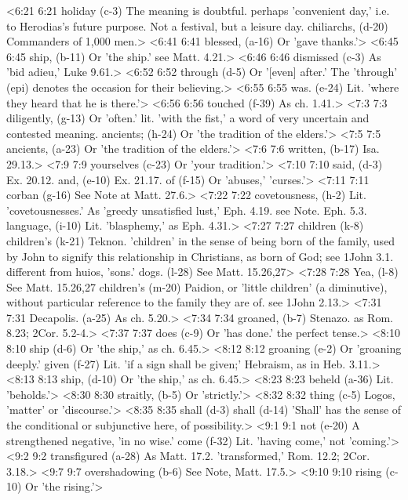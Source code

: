<6:21 6:21  holiday (c-3)  The meaning is doubtful. perhaps 'convenient day,' i.e. to  Herodias's future purpose. Not a festival, but a leisure day.
  chiliarchs, (d-20)  Commanders of 1,000 men.>
<6:41 6:41  blessed, (a-16)  Or 'gave thanks.'>
<6:45 6:45  ship, (b-11)  Or 'the ship.' see Matt. 4.21.>
<6:46 6:46  dismissed (c-3)  As 'bid adieu,' Luke 9.61.>
<6:52 6:52  through (d-5)  Or '[even] after.' The 'through' (epi) denotes the occasion  for their believing.>
<6:55 6:55  was. (e-24)  Lit. 'where they heard that he is there.'>
<6:56 6:56  touched (f-39)  As ch. 1.41.>
<7:3 7:3  diligently, (g-13)  Or 'often.' lit. 'with the fist,' a word of very uncertain  and contested meaning.
  ancients; (h-24)  Or 'the tradition of the elders.'>
<7:5 7:5  ancients, (a-23)  Or 'the tradition of the elders.'>
<7:6 7:6  written, (b-17)  Isa. 29.13.>
<7:9 7:9  yourselves (c-23)  Or 'your tradition.'>
<7:10 7:10  said, (d-3)  Ex. 20.12.
  and, (e-10)  Ex. 21.17.
  of (f-15)  Or 'abuses,' 'curses.'>
<7:11 7:11  corban (g-16)  See Note at Matt. 27.6.>
<7:22 7:22  covetousness, (h-2)  Lit. 'covetousnesses.' As 'greedy unsatisfied lust,' Eph.  4.19. see Note. Eph. 5.3.
  language, (i-10)  Lit. 'blasphemy,' as Eph. 4.31.>
<7:27 7:27  children (k-8)  children's (k-21)
  Teknon. 'children' in the sense of being born of the  family, used by John to signify this relationship in  Christians, as born of God; see 1John 3.1. different from  huios, 'sons.'
  dogs. (l-28) See Matt. 15.26,27>
<7:28 7:28  Yea, (l-8)  See Matt. 15.26,27
  children's (m-20)  Paidion, or 'little children' (a diminutive), without  particular reference to the family they are of. see 1John 2.13.>
<7:31 7:31  Decapolis. (a-25)  As ch. 5.20.>
<7:34 7:34  groaned, (b-7)  Stenazo. as Rom. 8.23; 2Cor. 5.2-4.>
<7:37 7:37  does (c-9)  Or 'has done.' the perfect tense.>
<8:10 8:10  ship (d-6) Or 'the ship,' as ch. 6.45.>
<8:12 8:12  groaning (e-2)  Or 'groaning deeply.'
  given (f-27)  Lit. 'if a sign shall be given;' Hebraism, as in Heb. 3.11.>
<8:13 8:13  ship, (d-10)  Or 'the ship,' as ch. 6.45.>
<8:23 8:23  beheld (a-36)  Lit. 'beholds.'>
<8:30 8:30  straitly, (b-5)  Or 'strictly.'>
<8:32 8:32  thing (c-5)  Logos, 'matter' or 'discourse.'>
<8:35 8:35  shall (d-3)  shall (d-14)
  'Shall' has the sense of the conditional or subjunctive here,  of possibility.>
<9:1 9:1  not (e-20)  A strengthened negative, 'in no wise.'
  come (f-32)  Lit. 'having come,' not 'coming.'>
<9:2 9:2  transfigured (a-28)  As Matt. 17.2. 'transformed,' Rom. 12.2; 2Cor. 3.18.>
<9:7 9:7  overshadowing (b-6)  See Note, Matt. 17.5.>
<9:10 9:10  rising (c-10)  Or 'the rising.'>
